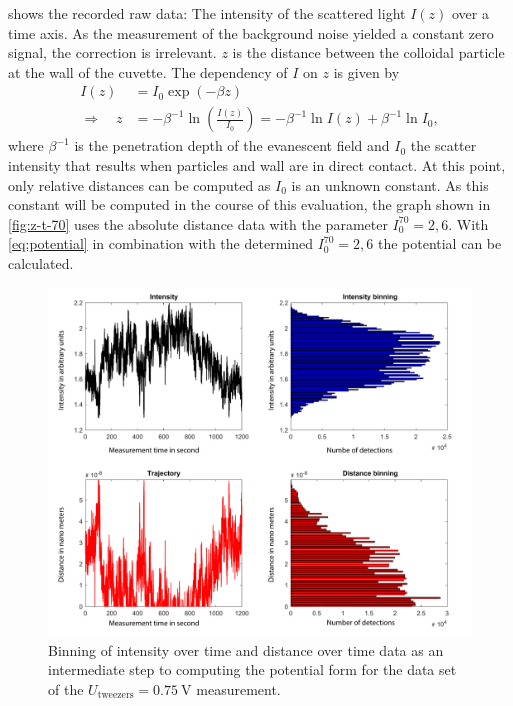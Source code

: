 \documentclass[../bericht.tex]{subfiles}
\begin{document}
       shows the recorded raw data: The intensity of the scattered light $I(z)$ over a time axis. As the measurement of the background noise yielded a constant zero signal, the correction is irrelevant.  $z$ is the distance between the colloidal particle at the wall of the cuvette. The dependency of $I$ on $z$ is given by
      \begin{align}
        I(z)&=I_0 \exp\left( -\beta z \right)  \\
        \Rightarrow \quad z&=-\beta^{-1} \ln \left(\frac{I(z)}{I_0}\right)=-\beta^{-1}\ln I(z) + \beta^{-1}\ln I_0,
      \end{align}
      where $\beta^{-1}$ is the penetration depth of the evanescent field and $I_0$ the scatter intensity that results when particles and wall are in direct contact. At this point, only relative distances can be computed as $I_0$ is an unknown constant. As this constant will be computed in the course of this evaluation, the graph shown in \cref{fig:z-t-70} uses the absolute distance data with the parameter $I_0^{70}=2,6$. With \cref{eq:potential} in combination with the determined  $I_0^{70}=2,6$ the potential can be calculated.
      \medskip

      \begin{figure}[p]
        \centering
        \includegraphics[width=\textwidth]{figures/75intensity_trajectory.pdf}
        \caption{Binning of intensity over time and distance over time data as an intermediate step to computing the potential form for the data set of the $U_\mathrm{tweezers}=\SI{0,75}{\volt}$ measurement.}
        \label{fig:pot-deriv}
      \end{figure}
\end{document}

